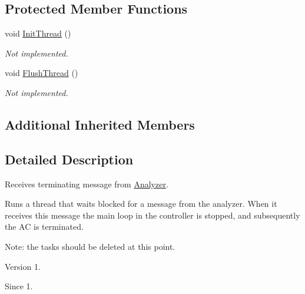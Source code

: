 \subsection*{Protected Member Functions}
\begin{DoxyCompactItemize}
\item 
\hypertarget{class_shut_down_slave_a35e968c4c2ae77a228b0fc1a39b03fe0}{void \hyperlink{class_shut_down_slave_a35e968c4c2ae77a228b0fc1a39b03fe0}{Init\-Thread} ()}\label{class_shut_down_slave_a35e968c4c2ae77a228b0fc1a39b03fe0}

\begin{DoxyCompactList}\small\item\em Not implemented. \end{DoxyCompactList}\item 
\hypertarget{class_shut_down_slave_ad4615bf7718a147274d9deaa01331af7}{void \hyperlink{class_shut_down_slave_ad4615bf7718a147274d9deaa01331af7}{Flush\-Thread} ()}\label{class_shut_down_slave_ad4615bf7718a147274d9deaa01331af7}

\begin{DoxyCompactList}\small\item\em Not implemented. \end{DoxyCompactList}\end{DoxyCompactItemize}
\subsection*{Additional Inherited Members}


\subsection{Detailed Description}
Receives terminating message from \hyperlink{class_analyzer}{Analyzer}. 

Runs a thread that waits blocked for a message from the analyzer. When it receives this message the main loop in the controller is stopped, and subsequently the A\-C is terminated.

Note\-: the tasks should be deleted at this point.

\begin{DoxyVersion}{Version}
1. 
\end{DoxyVersion}
\begin{DoxySince}{Since}
1. 
\end{DoxySince}


